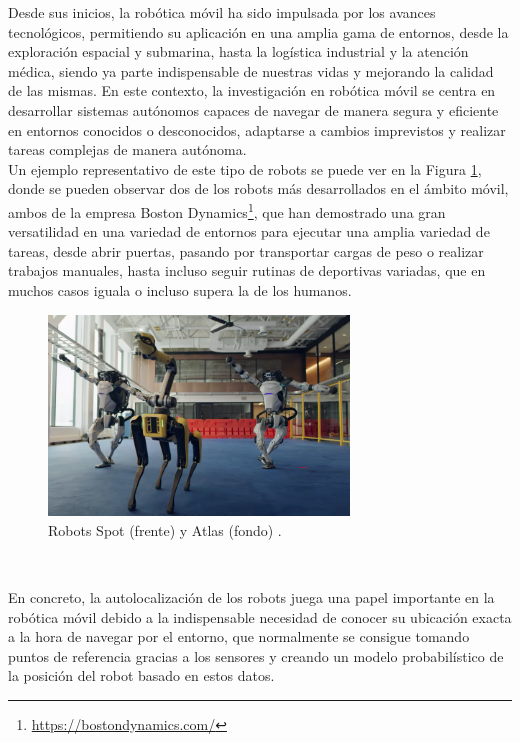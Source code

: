 Desde sus inicios, la robótica móvil ha sido impulsada por los avances
tecnológicos, permitiendo su aplicación en una amplia gama de entornos, desde la
exploración espacial y submarina, hasta la logística industrial y la atención
médica, siendo ya parte indispensable de nuestras vidas y mejorando la calidad
de las mismas.
En este contexto, la investigación en robótica móvil se centra en desarrollar
sistemas autónomos capaces de navegar de manera segura y eficiente en entornos
conocidos o desconocidos, adaptarse a cambios imprevistos y realizar tareas
complejas de manera autónoma.
\\

Un ejemplo representativo de este tipo de robots se puede ver en la Figura
\ref{fig:boston_dynamics}, donde se pueden observar dos de los robots más
desarrollados en el ámbito móvil, ambos de la empresa Boston Dynamics\footnote{
\href{https://bostondynamics.com/}{https://bostondynamics.com/}}, que han
demostrado una gran versatilidad en una variedad de entornos para ejecutar una
amplia variedad de tareas, desde abrir puertas, pasando por transportar cargas
de peso o realizar trabajos manuales, hasta incluso seguir rutinas de deportivas
variadas, que en muchos casos iguala o incluso supera la de los humanos.

\begin{figure} [h!]
  \begin{center}
    \includegraphics[width=8cm]{figs/atlas_spot_robots}
  \end{center}
  \caption{Robots Spot (frente) y Atlas (fondo) \cite{atlas_spot}.}
  \label{fig:boston_dynamics}
\end{figure}\

En concreto, la autolocalización de los robots juega una papel importante en la
robótica móvil debido a la indispensable necesidad de conocer su ubicación
exacta a la hora de navegar por el entorno, que normalmente se consigue tomando
puntos de referencia gracias a los sensores y creando un modelo probabilístico
de la posición del robot basado en estos datos.
\\

